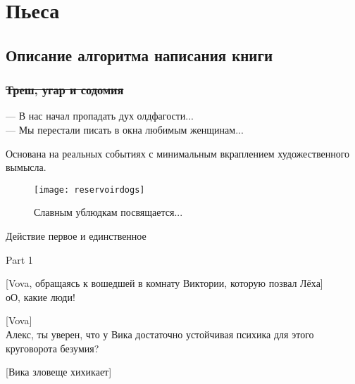 \section*{Пьеса}
\subsection*{Описание алгоритма написания книги}
\subsubsection*{\sout{Треш, угар и содомия}} %
\begin{epigraph}
    --- В нас начал пропадать дух олдфагости...\\
    --- Мы перестали писать в окна любимым женщинам...
\end{epigraph}

Основана на реальных событиях с минимальным вкраплением художественного вымысла.\\ 

\begin{figure}[ht!]
    \centering
    \texttt{[image: reservoirdogs]}
    \caption{Славным ублюдкам посвящается...}
\end{figure}

\begin{center}
\Large Действие первое и единственное %
\end{center}


{\small{}}


{\small{}}

\begin{center}
\large Part 1
\end{center}


[Vova, обращаясь к вошедшей в комнату Виктории, которую позвал Лёха]\\
оО, какие люди!


[Vova]\\
Алекс, ты уверен, что у Вика достаточно устойчивая психика для этого круговорота безумия?


[Вика зловеще хихикает]


